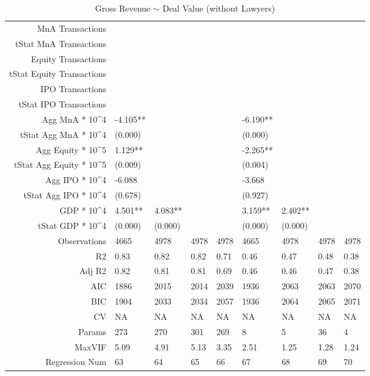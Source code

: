 \begin{table}[ht]
\begin{tabular}{rllllllll}
  MnA Transactions &  &  &  &  &  &  &  &  \\ 
  tStat MnA Transactions &  &  &  &  &  &  &  &  \\ 
  Equity Transactions &  &  &  &  &  &  &  &  \\ 
  tStat Equity Transactions &  &  &  &  &  &  &  &  \\ 
  IPO Transactions &  &  &  &  &  &  &  &  \\ 
  tStat IPO Transactions &  &  &  &  &  &  &  &  \\ 
  Agg MnA * 10^4 & -4.105** &  &  &  & -6.190** &  &  &  \\ 
  tStat Agg MnA * 10^4 & (0.000) &  &  &  & (0.000) &  &  &  \\ 
  Agg Equity * 10^5 & 1.129** &  &  &  & -2.265** &  &  &  \\ 
  tStat Agg Equity * 10^5 & (0.009) &  &  &  & (0.004) &  &  &  \\ 
  Agg IPO * 10^4 & -6.088 &  &  &  & -3.668 &  &  &  \\ 
  tStat Agg IPO * 10^4 & (0.678) &  &  &  & (0.927) &  &  &  \\ 
  GDP * 10^4 & 4.501** & 4.083** &  &  & 3.159** & 2.402** &  &  \\ 
  tStat GDP * 10^4 & (0.000) & (0.000) &  &  & (0.000) & (0.000) &  &  \\ 
  Observations & 4665 & 4978 & 4978 & 4978 & 4665 & 4978 & 4978 & 4978 \\ 
  R2 & 0.83 & 0.82 & 0.82 & 0.71 & 0.46 & 0.47 & 0.48 & 0.38 \\ 
  Adj R2 & 0.82 & 0.81 & 0.81 & 0.69 & 0.46 & 0.46 & 0.47 & 0.38 \\ 
  AIC & 1886 & 2015 & 2014 & 2039 & 1936 & 2063 & 2063 & 2070 \\ 
  BIC & 1904 & 2033 & 2034 & 2057 & 1936 & 2064 & 2065 & 2071 \\ 
  CV & NA & NA & NA & NA & NA & NA & NA & NA \\ 
  Params & 273 & 270 & 301 & 269 & 8 & 5 & 36 & 4 \\ 
  MaxVIF & 5.09 & 4.91 & 5.13 & 3.35 & 2.51 & 1.25 & 1.28 & 1.24 \\ 
  Regression Num & 63 & 64 & 65 & 66 & 67 & 68 & 69 & 70 \\ 
   \hline
\end{tabular}
\caption{Gross Revenue $\sim$ Deal Value (without Lawyers)} 
\end{table}

